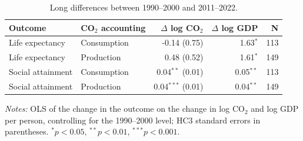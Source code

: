 \begin{table}[tbp]
\centering
\small
\caption{Long differences between 1990–2000 and 2011–2022.}
\label{tab:longdiff}
\begin{threeparttable}
\begin{tabular}{llrrr}
\toprule
Outcome & CO$_2$ accounting & $\Delta$ log CO$_2$ & $\Delta$ log GDP & N \\
\midrule
Life expectancy & Consumption & -0.14 (0.75) & 1.63$^{*}$ & 113 \\
Life expectancy & Production & 0.48 (0.52) & 1.61$^{*}$ & 149 \\
Social attainment & Consumption & 0.04$^{**}$ (0.01) & 0.05$^{**}$ & 113 \\
Social attainment & Production & 0.04$^{***}$ (0.01) & 0.04$^{**}$ & 149 \\
\bottomrule
\end{tabular}
\begin{tablenotes}[flushleft]
\footnotesize
\item \textit{Notes:} OLS of the change in the outcome on the change in log CO$_2$ and log GDP per person, controlling for the 1990–2000 level; HC3 standard errors in parentheses. $^{*}p<0.05$, $^{**}p<0.01$, $^{***}p<0.001$.
\end{tablenotes}
\end{threeparttable}
\end{table}

